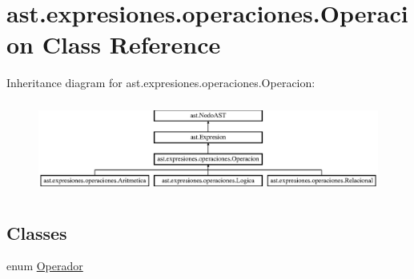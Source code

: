 \hypertarget{classast_1_1expresiones_1_1operaciones_1_1_operacion}{}\section{ast.\+expresiones.\+operaciones.\+Operacion Class Reference}
\label{classast_1_1expresiones_1_1operaciones_1_1_operacion}
Inheritance diagram for ast.\+expresiones.\+operaciones.\+Operacion\+:\begin{figure}[H]
\begin{center}
\leavevmode
\includegraphics[height=3.035230cm]{classast_1_1expresiones_1_1operaciones_1_1_operacion}
\end{center}
\end{figure}
\subsection*{Classes}
\begin{DoxyCompactItemize}
\item 
enum \mbox{\hyperlink{enumast_1_1expresiones_1_1operaciones_1_1_operacion_1_1_operador}{Operador}}
\end{DoxyCompactItemize}
